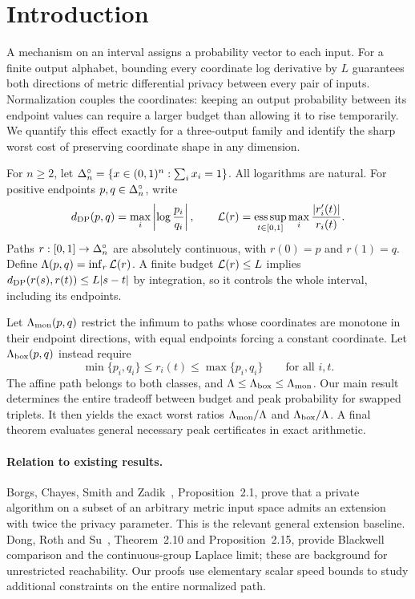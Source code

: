 \section{Introduction}
A mechanism on an interval assigns a probability vector to each input. For a finite output alphabet, bounding every coordinate log derivative by $L$ guarantees both directions of metric differential privacy between every pair of inputs. Normalization couples the coordinates: keeping an output probability between its endpoint values can require a larger budget than allowing it to rise temporarily. We quantify this effect exactly for a three-output family and identify the sharp worst cost of preserving coordinate shape in any dimension.

For $n\ge2$, let $\Delta_n^\circ=\{x\in(0,1)^n:\sum_i x_i=1\}$. All logarithms are natural. For positive endpoints $p,q\in\Delta_n^\circ$, write
\begin{equation}\label{eq:model}
 d_{\mathrm{DP}}(p,q)=\max_i\left|\log\frac{p_i}{q_i}\right|,
 \qquad \mathcal L(r)=\operatorname*{ess\,sup}_{t\in[0,1]}\max_i\frac{|r_i'(t)|}{r_i(t)}.
\end{equation}
Paths $r:[0,1]\to\Delta_n^\circ$ are absolutely continuous, with $r(0)=p$ and $r(1)=q$. Define $\Lambda(p,q)=\inf_r\mathcal L(r)$. A finite budget $\mathcal L(r)\le L$ implies $d_{\mathrm{DP}}(r(s),r(t))\le L|s-t|$ by integration, so it controls the whole interval, including its endpoints.

Let $\Lambda_{\mathrm{mon}}(p,q)$ restrict the infimum to paths whose coordinates are monotone in their endpoint directions, with equal endpoints forcing a constant coordinate. Let $\Lambda_{\mathrm{box}}(p,q)$ instead require
\begin{equation}\label{eq:box}
 \min\{p_i,q_i\}\le r_i(t)\le\max\{p_i,q_i\}\qquad\text{for all }i,t.
\end{equation}
The affine path belongs to both classes, and
$\Lambda\le\Lambda_{\mathrm{box}}\le\Lambda_{\mathrm{mon}}$. Our main result determines the entire tradeoff between budget and peak probability for swapped triplets. It then yields the exact worst ratios $\Lambda_{\mathrm{mon}}/\Lambda$ and $\Lambda_{\mathrm{box}}/\Lambda$. A final theorem evaluates general necessary peak certificates in exact arithmetic.

\paragraph{Relation to existing results.}
Borgs, Chayes, Smith and Zadik~\cite{BCSZ18}, Proposition~2.1, prove that a private algorithm on a subset of an arbitrary metric input space admits an extension with twice the privacy parameter. This is the relevant general extension baseline. Dong, Roth and Su~\cite{DRS19}, Theorem~2.10 and Proposition~2.15, provide Blackwell comparison and the continuous-group Laplace limit; these are background for unrestricted reachability. Our proofs use elementary scalar speed bounds to study additional constraints on the entire normalized path.

